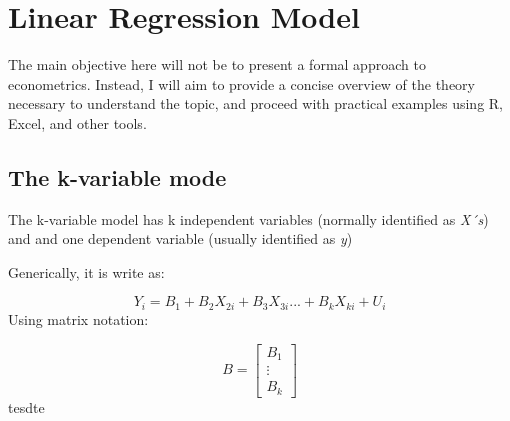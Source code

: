 \documentclass{article} %
\begin{document}
\section{Linear Regression Model}
The main objective here will not be to present a formal approach to econometrics. Instead, I will aim to provide a concise overview of the theory necessary to understand the topic, and proceed with practical examples using R, Excel, and other tools.

\subsection{The k-variable mode}
The k-variable model has k independent variables (normally identified as\textit{ X´s}) and and one dependent variable (usually identified as \textit{y})

Generically, it is write as:

\[Y_i = B_1 + B_2X_{2i}+B_3X_{3i}...+B_kX_{ki}+ U_i\]
Using matrix notation:

\[B = \begin{bmatrix}B_1 \\\vdots \\B_k\end{bmatrix}\]
tesdte
\end{document}
